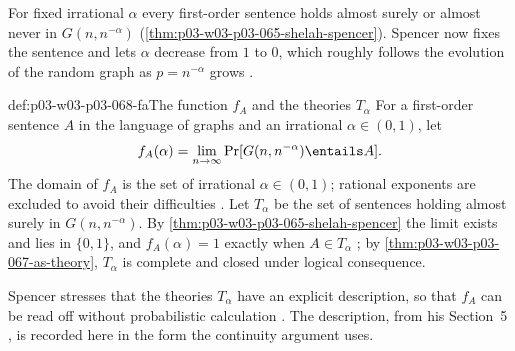 For fixed irrational \(\alpha\) every first-order sentence holds almost
surely or almost never in \(G(n,n^{-\alpha})\)
(\cref{thm:p03-w03-p03-065-shelah-spencer}).  Spencer now fixes the sentence
and lets \(\alpha\) decrease from \(1\) to \(0\), which roughly follows the
evolution of the random graph as \(p=n^{-\alpha}\) grows
\cite[p.~15]{Spencer2007LogicRandomStructuresAuthor}.

\begin{hbdefinition}{def:p03-w03-p03-068-fa}{The function \(f_A\) and the theories \(T_\alpha\)}
For a first-order sentence \(A\) in the language of graphs and an
irrational \(\alpha\in(0,1)\), let
\[
  f_A(\alpha)=\lim_{n\to\infty}\Pr[G(n,n^{-\alpha})\entails A].
\]
The domain of \(f_A\) is the set of irrational \(\alpha\in(0,1)\); rational
exponents are excluded to avoid their difficulties
\cite[p.~15]{Spencer2007LogicRandomStructuresAuthor}.  Let \(T_\alpha\) be the set of
sentences holding almost surely in \(G(n,n^{-\alpha})\).  By
\cref{thm:p03-w03-p03-065-shelah-spencer} the limit exists and lies in
\(\{0,1\}\), and \(f_A(\alpha)=1\) exactly when \(A\in T_\alpha\)
\cite[p.~15]{Spencer2007LogicRandomStructuresAuthor}; by
\cref{thm:p03-w03-p03-067-as-theory}, \(T_\alpha\) is complete and closed
under logical consequence.
\end{hbdefinition}

Spencer stresses that the theories \(T_\alpha\) have an explicit description,
so that \(f_A\) can be read off without probabilistic calculation
\cite[p.~15]{Spencer2007LogicRandomStructuresAuthor}.  The description, from his Section~5
\cite[p.~10]{Spencer2007LogicRandomStructuresAuthor}, is recorded here in the form the
continuity argument uses.

